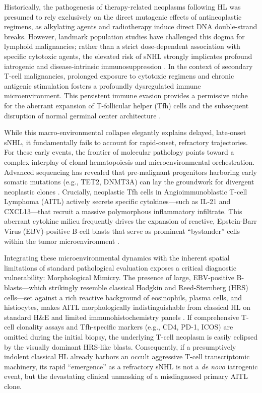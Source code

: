 \documentclass[a4paper,11pt,twocolumn]{article}
\begin{document}
	Historically, the pathogenesis of therapy-related neoplasms following HL was presumed to rely exclusively on the direct mutagenic effects of antineoplastic regimens, as alkylating agents and radiotherapy induce direct DNA double-strand breaks. However, landmark population studies have challenged this dogma for lymphoid malignancies; rather than a strict dose-dependent association with specific cytotoxic agents, the elevated risk of sNHL strongly implicates profound iatrogenic and disease-intrinsic immunosuppression \cite{Schaapveld2015}. In the context of secondary T-cell malignancies, prolonged exposure to cytotoxic regimens and chronic antigenic stimulation fosters a profoundly dysregulated immune microenvironment. This persistent immune evasion provides a permissive niche for the aberrant expansion of T-follicular helper (Tfh) cells and the subsequent disruption of normal germinal center architecture \cite{Alaggio2022, Lemonnier2012}.
	
	While this macro-environmental collapse elegantly explains delayed, late-onset sNHL, it fundamentally fails to account for rapid-onset, refractory trajectories. For these early events, the frontier of molecular pathology points toward a complex interplay of clonal hematopoiesis and microenvironmental orchestration. Advanced sequencing has revealed that pre-malignant progenitors harboring early somatic mutations (e.g., TET2, DNMT3A) can lay the groundwork for divergent neoplastic clones \cite{Odejide2014}. Crucially, neoplastic Tfh cells in Angioimmunoblastic T-cell Lymphoma (AITL) actively secrete specific cytokines—such as IL-21 and CXCL13—that recruit a massive polymorphous inflammatory infiltrate. This aberrant cytokine milieu frequently drives the expansion of reactive, Epstein-Barr Virus (EBV)-positive B-cell blasts that serve as prominent ``bystander'' cells within the tumor microenvironment \cite{deLeval2007, Swerdlow2016}.
	
	Integrating these microenvironmental dynamics with the inherent spatial limitations of standard pathological evaluation exposes a critical diagnostic vulnerability: Morphological Mimicry. The presence of large, EBV-positive B-blasts—which strikingly resemble classical Hodgkin and Reed-Sternberg (HRS) cells—set against a rich reactive background of eosinophils, plasma cells, and histiocytes, makes AITL morphologically indistinguishable from classical HL on standard H\&E and limited immunohistochemistry panels \cite{Attygalle2002, deLeval2007, Swerdlow2016}. If comprehensive T-cell clonality assays and Tfh-specific markers (e.g., CD4, PD-1, ICOS) are omitted during the initial biopsy, the underlying T-cell neoplasm is easily eclipsed by the visually dominant HRS-like blasts. Consequently, if a presumptively indolent classical HL already harbors an occult aggressive T-cell transcriptomic machinery, its rapid ``emergence'' as a refractory sNHL is not a \textit{de novo} iatrogenic event, but the devastating clinical unmasking of a misdiagnosed primary AITL clone.
	
\end{document}
